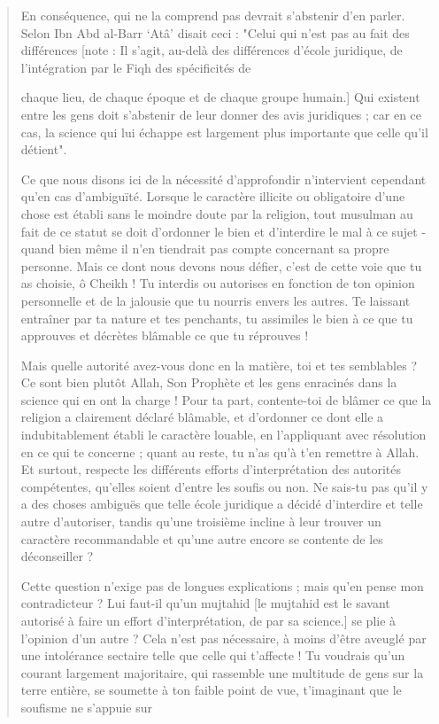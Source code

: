 \begin{quote}
En conséquence, qui ne la comprend pas devrait s'abstenir d'en parler.
Selon Ibn Abd al-Barr `Atâ' disait ceci : "Celui qui n'est pas au fait
des différences {[}note : Il s'agit, au-delà des différences d'école
juridique, de l'intégration par le Fiqh des spécificités de

chaque lieu, de chaque époque et de chaque groupe humain.{]} Qui
existent entre les gens doit s'abstenir de leur donner des avis
juridiques ; car en ce cas, la science qui lui échappe est largement
plus importante que celle qu'il détient".

Ce que nous disons ici de la nécessité d'approfondir n'intervient
cependant qu'en cas d'ambiguïté. Lorsque le caractère illicite ou
obligatoire d'une chose est établi sans le moindre doute par la
religion, tout musulman au fait de ce statut se doit d'ordonner le bien
et d'interdire le mal à ce sujet - quand bien même il n'en tiendrait pas
compte concernant sa propre personne. Mais ce dont nous devons nous
défier, c'est de cette voie que tu as choisie, ô Cheikh ! Tu interdis ou
autorises en fonction de ton opinion personnelle et de la jalousie que
tu nourris envers les autres. Te laissant entraîner par ta nature et tes
penchants, tu assimiles le bien à ce que tu approuves et décrètes
blâmable ce que tu réprouves !

Mais quelle autorité avez-vous donc en la matière, toi et tes semblables
? Ce sont bien plutôt Allah, Son Prophète et les gens enracinés dans la
science qui en ont la charge ! Pour ta part, contente-toi de blâmer ce
que la religion a clairement déclaré blâmable, et d'ordonner ce dont
elle a indubitablement établi le caractère louable, en l'appliquant avec
résolution en ce qui te concerne ; quant au reste, tu n'as qu'à t'en
remettre à Allah. Et surtout, respecte les différents efforts
d'interprétation des autorités compétentes, qu'elles soient d'entre les
soufis ou non. Ne sais-tu pas qu'il y a des choses ambiguës que telle
école juridique a décidé d'interdire et telle autre d'autoriser, tandis
qu'une troisième incline à leur trouver un caractère recommandable et
qu'une autre encore se contente de les déconseiller ?

Cette question n'exige pas de longues explications ; mais qu'en pense
mon contradicteur ? Lui faut-il qu'un mujtahid {[}le mujtahid est le
savant autorisé à faire un effort d'interprétation, de par sa
science.{]} se plie à l'opinion d'un autre ? Cela n'est pas nécessaire,
à moins d'être aveuglé par une intolérance sectaire telle que celle qui
t'affecte ! Tu voudrais qu'un courant largement majoritaire, qui
rassemble une multitude de gens sur la terre entière, se soumette à ton
faible point de vue, t'imaginant que le soufisme ne s'appuie sur


\end{quote}
